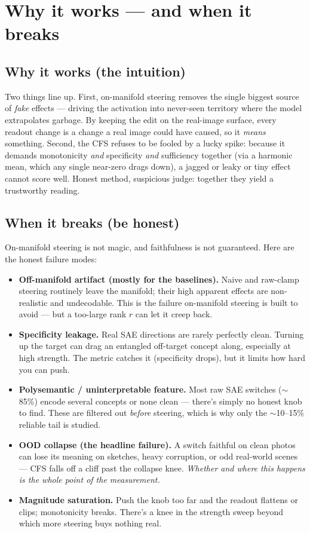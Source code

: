 \documentclass[12pt]{article}
\begin{document}
\section{Why it works --- and when it breaks}

\subsection*{Why it works (the intuition)}
Two things line up. First, on-manifold steering removes the single biggest source of \emph{fake} effects --- driving the activation into never-seen territory where the model extrapolates garbage. By keeping the edit on the real-image surface, every readout change is a change a real image could have caused, so it \emph{means} something. Second, the CFS refuses to be fooled by a lucky spike: because it demands monotonicity \emph{and} specificity \emph{and} sufficiency together (via a harmonic mean, which any single near-zero drags down), a jagged or leaky or tiny effect cannot score well. Honest method, suspicious judge: together they yield a trustworthy reading.

\subsection*{When it breaks (be honest)}
On-manifold steering is not magic, and faithfulness is not guaranteed. Here are the honest failure modes:

\begin{itemize}[leftmargin=1.4em, itemsep=3pt]
  \item \textbf{Off-manifold artifact (mostly for the baselines).} Naive and raw-clamp steering routinely leave the manifold; their high apparent effects are non-realistic and undecodable. This is the failure on-manifold steering is built to avoid --- but a too-large rank $r$ can let it creep back.
  \item \textbf{Specificity leakage.} Real SAE directions are rarely perfectly clean. Turning up the target can drag an entangled off-target concept along, especially at high strength. The metric catches it (specificity drops), but it limits how hard you can push.
  \item \textbf{Polysemantic / uninterpretable feature.} Most raw SAE switches ($\sim$85\%) encode several concepts or none clean --- there's simply no honest knob to find. These are filtered out \emph{before} steering, which is why only the $\sim$10--15\% reliable tail is studied.
  \item \textbf{OOD collapse (the headline failure).} A switch faithful on clean photos can lose its meaning on sketches, heavy corruption, or odd real-world scenes --- CFS falls off a cliff past the collapse knee. \emph{Whether and where this happens is the whole point of the measurement.}
  \item \textbf{Magnitude saturation.} Push the knob too far and the readout flattens or clips; monotonicity breaks. There's a knee in the strength sweep beyond which more steering buys nothing real.
\end{itemize}
\end{document}
